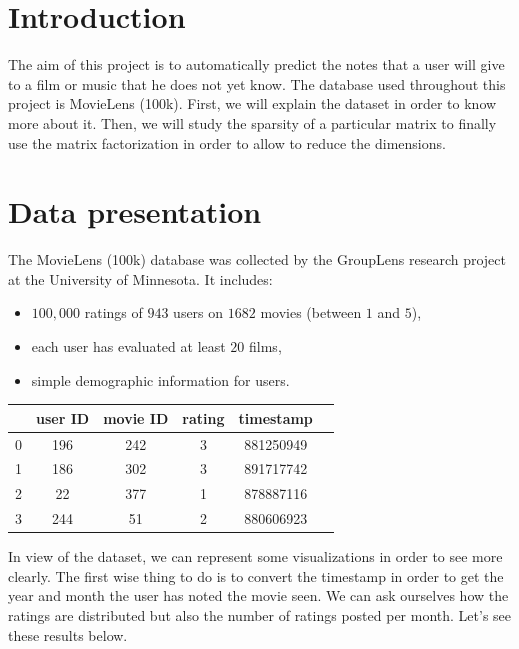 \documentclass{article}
\begin{document}
\section*{Introduction}

The aim of this project is to automatically predict the notes that a user will give to a film or music that he does not yet know. The database used throughout this project is MovieLens (100k).
First, we will explain the dataset in order to know more about it. Then, we will study the sparsity of a particular matrix to finally use the matrix factorization in order to allow to reduce the dimensions.

\section{Data presentation}
The MovieLens (100k) database was collected by the GroupLens research project at the University of Minnesota. It includes:
\begin{itemize}
    \item $100,000$ ratings of $943$ users on $1682$ movies (between $1$ and $5$),
    \item each user has evaluated at least $20$ films,
    \item simple demographic information for users.
\end{itemize}

\begin{center}
    \begin{tabular}{|c|c|c|c|c|c|}
    \hline
         & user ID & movie ID & rating & timestamp \\
         \hline \hline
         0 & 196 & 242 & 3 & 881250949\\
         1 & 186 & 302 & 3 & 891717742\\
         2 & 22 & 377 & 1 & 878887116\\
         3 & 244 & 51 & 2 & 880606923\\
         \hline
    \end{tabular}
\end{center}

In view of the dataset, we can represent some visualizations in order to see more clearly.
The first wise thing to do is to convert the timestamp in order to get the year and month the user has noted the movie  seen.
We can ask ourselves how the ratings are distributed but also the number of ratings posted per month. Let’s see these results below.
\end{document}
